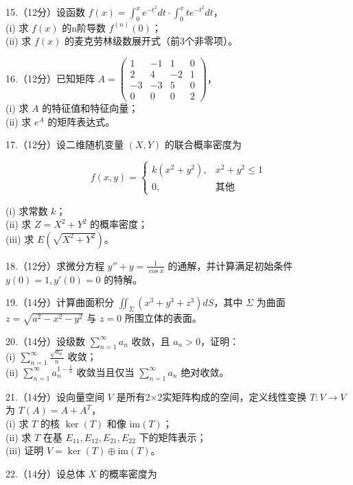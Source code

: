\documentclass[UTF8]{ctexart}
\begin{document}
15.（12分）设函数
\( f(x) = \int_0^x e^{-t^2} dt \cdot \int_0^x t e^{-t^2} dt \)，\\
(i) 求 \( f(x) \) 的n阶导数 \( f^{(n)}(0) \)；\\
(ii) 求 \( f(x) \) 的麦克劳林级数展开式（前3个非零项）。

16.（12分）已知矩阵 \( A = \begin{pmatrix} 
1 & -1 & 1 & 0 \\
2 & 4 & -2 & 1 \\
-3 & -3 & 5 & 0 \\
0 & 0 & 0 & 2 
\end{pmatrix} \)，\\
(i) 求 \( A \) 的特征值和特征向量；\\
(ii) 求 \( e^A \) 的矩阵表达式。

17.（12分）设二维随机变量 \( (X,Y) \) 的联合概率密度为

\[f(x,y) = \begin{cases} 
k(x^2 + y^2), & x^2 + y^2 \leq 1 \\
0, & 其他 
\end{cases}\]

(i) 求常数 \( k \)；\\
(ii) 求 \( Z = X^2 + Y^2 \) 的概率密度；\\
(iii) 求 \( E(\sqrt{X^2 + Y^2}) \)。

18.（12分）求微分方程 \( y'' + y = \frac{1}{\cos x} \)
的通解，并计算满足初始条件 \( y(0)=1, y'(0)=0 \) 的特解。

19.（14分）计算曲面积分 \( \iint_{\Sigma} (x^3 + y^3 + z^3) dS \)，其中
\( \Sigma \) 为曲面 \( z = \sqrt{a^2 - x^2 - y^2} \) 与 \( z = 0 \)
所围立体的表面。

20.（14分）设级数 \( \sum_{n=1}^{\infty} a_n \) 收敛，且
\( a_n > 0 \)，证明：\\
(i) \( \sum_{n=1}^{\infty} \frac{\sqrt{a_n}}{n} \) 收敛；\\
(ii) \( \sum_{n=1}^{\infty} a_n^{1 - \frac{1}{n}} \) 收敛当且仅当
\( \sum_{n=1}^{\infty} a_n \) 绝对收敛。

21.（14分）设向量空间 \( V \) 是所有2×2实矩阵构成的空间，定义线性变换
\( T: V \to V \) 为 \( T(A) = A + A^T \)，\\
(i) 求 \( T \) 的核 \( \ker(T) \) 和像 \( \text{im}(T) \)；\\
(ii) 求 \( T \) 在基 \( E_{11}, E_{12}, E_{21}, E_{22} \)
下的矩阵表示；\\
(iii) 证明 \( V = \ker(T) \oplus \text{im}(T) \)。

22.（14分）设总体 \( X \) 的概率密度为
\end{document}
